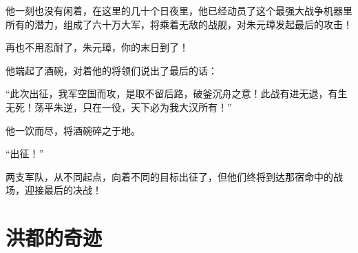\begin{multicols}{\theparacolNo}
		他一刻也没有闲着，在这里的几十个日夜里，他已经动员了这个最强大战争机器里所有的潜力，组成了六十万大军，将乘着无敌的战舰，对朱元璋发起最后的攻击！

		再也不用忍耐了，朱元璋，你的末日到了！

		他端起了酒碗，对着他的将领们说出了最后的话：

		“此次出征，我军空国而攻，是取不留后路，破釜沉舟之意！此战有进无退，有生无死！荡平朱逆，只在一役，天下必为我大汉所有！”

		他一饮而尽，将酒碗碎之于地。

		“出征！”

		两支军队，从不同起点，向着不同的目标出征了，但他们终将到达那宿命中的战场，迎接最后的决战！
		\ifnum{}
	\end{multicols}
\fi
\newpage
\section{洪都的奇迹}
\ifnum{}
